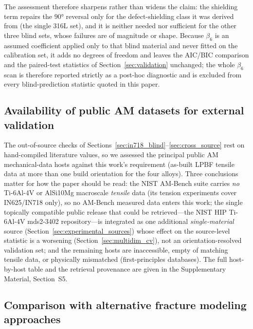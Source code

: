 \documentclass[twocolumn]{sagej}
\begin{document}
The assessment therefore sharpens rather than widens the claim: the shielding term repairs the $\ang{90}$ reversal only for the defect-shielding class it was derived from (the single 316L set), and it is neither needed nor sufficient for the other three blind sets, whose failures are of magnitude or shape. Because $\beta_6$ is an assumed coefficient applied only to that blind material and never fitted on the calibration set, it adds no degrees of freedom and leaves the AIC/BIC comparison and the paired-test statistics of Section~\ref{sec:validation} unchanged; the whole $\beta_6$ scan is therefore reported strictly as a post-hoc diagnostic and is excluded from every blind-prediction statistic quoted in this paper.


\subsection{Availability of public AM datasets for external validation}
\label{sec:public_datasets}

The out-of-source checks of Sections~\ref{sec:in718_blind}--\ref{sec:cross_source} rest on hand-compiled literature values, so we assessed the principal public AM mechanical-data hosts against this work's requirement (as-built LPBF tensile data at more than one build orientation for the four alloys). Three conclusions matter for how the paper should be read: the NIST AM-Bench suite carries \emph{no} Ti-6Al-4V or AlSi10Mg macroscale \emph{tensile} data (its tension experiments cover IN625/IN718 only), so no AM-Bench measured data enters this work; the single topically compatible public release that could be retrieved---the NIST HIP Ti-6Al-4V mds2-3402 repository---is integrated as one additional \emph{single-material} source (Section~\ref{sec:experimental_sources}) whose effect on the source-level statistic is a worsening (Section~\ref{sec:multidim_cv}), not an orientation-resolved validation set; and the remaining hosts are inaccessible, empty of matching tensile data, or physically mismatched (first-principles databases). The full host-by-host table and the retrieval provenance are given in the Supplementary Material, Section~S5.

\subsection{Comparison with alternative fracture modeling approaches}
\end{document}
